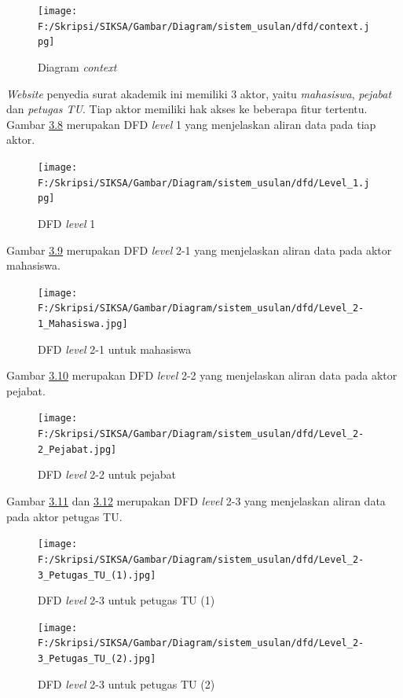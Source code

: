 \begin{figure}[H]
	\centering
		\texttt{[image: F:/Skripsi/SIKSA/Gambar/Diagram/sistem\_usulan/dfd/context.jpg]}
	\caption{Diagram \textit{context}}
	\label{fig:data_flow}
\end{figure}

\textit{Website} penyedia surat akademik ini memiliki 3 aktor, yaitu \textit{mahasiswa}, \textit{pejabat} dan \textit{petugas TU}. Tiap aktor memiliki hak akses ke beberapa fitur tertentu. Gambar \hyperlink{level_1}{3.8} merupakan DFD \textit{level} 1 yang menjelaskan aliran data pada tiap aktor.

\begin{figure}[H]
	\centering
		\texttt{[image: F:/Skripsi/SIKSA/Gambar/Diagram/sistem\_usulan/dfd/Level\_1.jpg]}
	\caption{DFD \textit{level} 1}
	\label{fig:level_1}
\end{figure}

Gambar \hyperlink{level_2-1}{3.9} merupakan DFD \textit{level} 2-1 yang menjelaskan aliran data pada aktor mahasiswa.

\begin{figure}[H]
	\centering
		\texttt{[image: F:/Skripsi/SIKSA/Gambar/Diagram/sistem\_usulan/dfd/Level\_2-1\_Mahasiswa.jpg]}
	\caption{DFD \textit{level} 2-1 untuk mahasiswa}
	\label{fig:level_2-1}
\end{figure}

Gambar \hyperlink{level_2-2}{3.10} merupakan DFD \textit{level} 2-2 yang menjelaskan aliran data pada aktor pejabat.

\begin{figure}[H]
	\centering
		\texttt{[image: F:/Skripsi/SIKSA/Gambar/Diagram/sistem\_usulan/dfd/Level\_2-2\_Pejabat.jpg]}
	\caption{DFD \textit{level} 2-2 untuk pejabat}
	\label{fig:level_2-2}
\end{figure}

Gambar \hyperlink{level_2-3(1)}{3.11} dan \hyperlink{level_2-3(2)}{3.12} merupakan DFD \textit{level} 2-3 yang menjelaskan aliran data pada aktor petugas TU.

\begin{figure}[H]
	\centering
		\texttt{[image: F:/Skripsi/SIKSA/Gambar/Diagram/sistem\_usulan/dfd/Level\_2-3\_Petugas\_TU\_(1).jpg]}
	\caption{DFD \textit{level} 2-3 untuk petugas TU (1)}
	\label{fig:level_2-3(1)}
\end{figure}

\begin{figure}[H]
	\centering
		\texttt{[image: F:/Skripsi/SIKSA/Gambar/Diagram/sistem\_usulan/dfd/Level\_2-3\_Petugas\_TU\_(2).jpg]}
	\caption{DFD \textit{level} 2-3 untuk petugas TU (2)}
	\label{fig:level_2-3(2)}
\end{figure}

